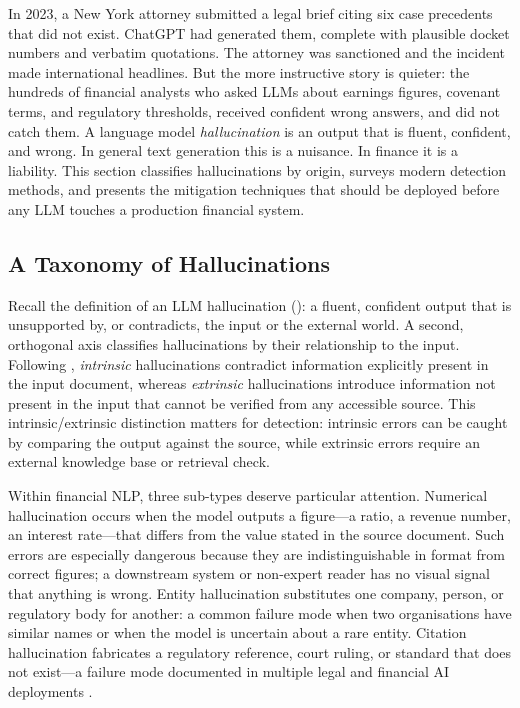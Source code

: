 \begin{context}

In 2023, a New York attorney submitted a legal brief citing six case precedents
that did not exist.  ChatGPT had generated them, complete with plausible docket
numbers and verbatim quotations.  The attorney was sanctioned and the incident
made international headlines.  But the more instructive story is quieter: the
hundreds of financial analysts who asked LLMs about earnings figures, covenant
terms, and regulatory thresholds, received confident wrong answers, and did not
catch them.  A language model \emph{hallucination} is an output that is fluent,
confident, and wrong.  In general text generation this is a nuisance.  In finance
it is a liability.  This section classifies hallucinations by origin, surveys
modern detection methods, and presents the mitigation techniques that should be
deployed before any LLM touches a production financial system.

\subsection{A Taxonomy of Hallucinations}
\label{sec:hallucinations-taxonomy}

Recall the definition of an LLM hallucination (): a fluent,
confident output that is unsupported by, or contradicts, the input or the external world.
A second, orthogonal axis classifies hallucinations by their relationship to the input.
Following \citet{maynez2020faithfulness}, \emph{intrinsic} hallucinations contradict
information explicitly present in the input document, whereas \emph{extrinsic}
hallucinations introduce information not present in the input that cannot be verified
from any accessible source. This intrinsic/extrinsic distinction matters for detection:
intrinsic errors can be caught by comparing the output against the source, while
extrinsic errors require an external knowledge base or retrieval check.

Within financial NLP, three sub-types deserve particular attention.
Numerical hallucination occurs when the model outputs a figure---a ratio, a revenue
number, an interest rate---that differs from the value stated in the source document.
Such errors are especially dangerous because they are indistinguishable in format from
correct figures; a downstream system or non-expert reader has no visual signal that
anything is wrong.  Entity hallucination substitutes one company, person, or
regulatory body for another: a common failure mode when two organisations have similar
names or when the model is uncertain about a rare entity.  Citation hallucination
fabricates a regulatory reference, court ruling, or standard that does not exist---a
failure mode documented in multiple legal and financial AI deployments \citep{ji2023survey}.


\end{context}
